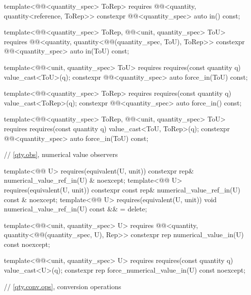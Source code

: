 \begin{codeblock}
{{  template<@@<quantity_spec> ToRep>
    requires @@<quantity, quantity<reference, ToRep>>
  constexpr @@<quantity_spec> auto in() const;

  template<@@<quantity_spec> ToRep,
           @@<unit, quantity_spec> ToU>
    requires @@<quantity,
                                   quantity<@@(quantity_spec, ToU{}), ToRep>>
  constexpr @@<quantity_spec> auto in(ToU) const;

  template<@@<unit, quantity_spec> ToU>
    requires requires(const quantity q) { value_cast<ToU{}>(q); }
  constexpr @@<quantity_spec> auto force_in(ToU) const;

  template<@@<quantity_spec> ToRep>
    requires requires(const quantity q) { value_cast<ToRep>(q); }
  constexpr @@<quantity_spec> auto force_in() const;

  template<@@<quantity_spec> ToRep,
           @@<unit, quantity_spec> ToU>
    requires requires(const quantity q) { value_cast<ToU{}, ToRep>(q); }
  constexpr @@<quantity_spec> auto force_in(ToU) const;

  // \ref{qty.obs}, numerical value observers

  template<@@ U>
    requires(equivalent(U{}, unit))
  constexpr rep& numerical_value_ref_in(U) & noexcept;
  template<@@ U>
    requires(equivalent(U{}, unit))
  constexpr const rep& numerical_value_ref_in(U) const & noexcept;
  template<@@ U>
    requires(equivalent(U{}, unit))
  void numerical_value_ref_in(U) const && = delete;

  template<@@<unit, quantity_spec> U>
    requires @@<quantity, quantity<@@(quantity_spec, U{}), Rep>>
  constexpr rep numerical_value_in(U) const noexcept;

  template<@@<unit, quantity_spec> U>
    requires requires(const quantity q) { value_cast<U{}>(q); }
  constexpr rep force_numerical_value_in(U) const noexcept;

  // \ref{qty.conv.ops}, conversion operations

}}
\end{codeblock}
